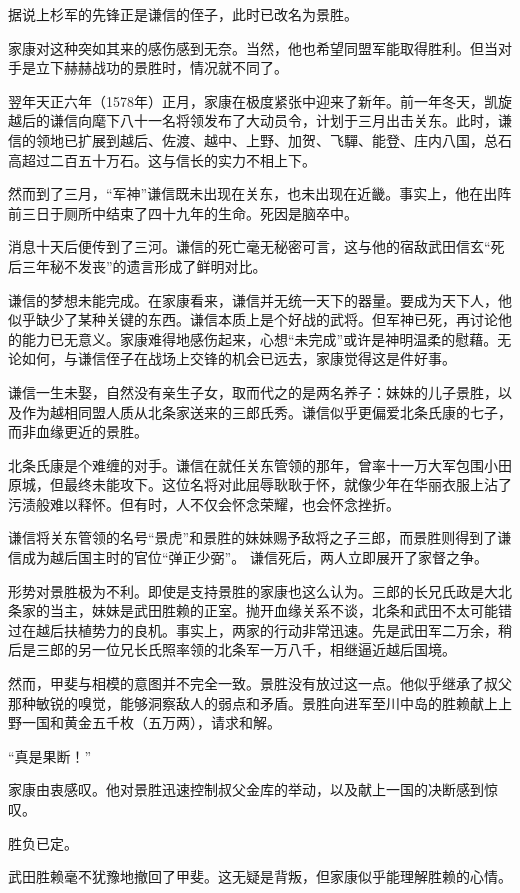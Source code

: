 \documentclass[
]{article}
\begin{document}
据说上杉军的先锋正是谦信的侄子，此时已改名为景胜。

家康对这种突如其来的感伤感到无奈。当然，他也希望同盟军能取得胜利。但当对手是立下赫赫战功的景胜时，情况就不同了。

翌年天正六年（1578年）正月，家康在极度紧张中迎来了新年。前一年冬天，凯旋越后的谦信向麾下八十一名将领发布了大动员令，计划于三月出击关东。此时，谦信的领地已扩展到越后、佐渡、越中、上野、加贺、飞驒、能登、庄内八国，总石高超过二百五十万石。这与信长的实力不相上下。

然而到了三月，``军神''谦信既未出现在关东，也未出现在近畿。事实上，他在出阵前三日于厕所中结束了四十九年的生命。死因是脑卒中。

消息十天后便传到了三河。谦信的死亡毫无秘密可言，这与他的宿敌武田信玄``死后三年秘不发丧''的遗言形成了鲜明对比。

谦信的梦想未能完成。在家康看来，谦信并无统一天下的器量。要成为天下人，他似乎缺少了某种关键的东西。谦信本质上是个好战的武将。但军神已死，再讨论他的能力已无意义。家康难得地感伤起来，心想``未完成''或许是神明温柔的慰藉。无论如何，与谦信侄子在战场上交锋的机会已远去，家康觉得这是件好事。

谦信一生未娶，自然没有亲生子女，取而代之的是两名养子：妹妹的儿子景胜，以及作为越相同盟人质从北条家送来的三郎氏秀。谦信似乎更偏爱北条氏康的七子，而非血缘更近的景胜。

北条氏康是个难缠的对手。谦信在就任关东管领的那年，曾率十一万大军包围小田原城，但最终未能攻下。这位名将对此屈辱耿耿于怀，就像少年在华丽衣服上沾了污渍般难以释怀。但有时，人不仅会怀念荣耀，也会怀念挫折。

谦信将关东管领的名号``景虎''和景胜的妹妹赐予敌将之子三郎，而景胜则得到了谦信成为越后国主时的官位``弹正少弼''。
谦信死后，两人立即展开了家督之争。

形势对景胜极为不利。即使是支持景胜的家康也这么认为。三郎的长兄氏政是大北条家的当主，妹妹是武田胜赖的正室。抛开血缘关系不谈，北条和武田不太可能错过在越后扶植势力的良机。事实上，两家的行动非常迅速。先是武田军二万余，稍后是三郎的另一位兄长氏照率领的北条军一万八千，相继逼近越后国境。

然而，甲斐与相模的意图并不完全一致。景胜没有放过这一点。他似乎继承了叔父那种敏锐的嗅觉，能够洞察敌人的弱点和矛盾。景胜向进军至川中岛的胜赖献上上野一国和黄金五千枚（五万两），请求和解。

``真是果断！''

家康由衷感叹。他对景胜迅速控制叔父金库的举动，以及献上一国的决断感到惊叹。

胜负已定。

武田胜赖毫不犹豫地撤回了甲斐。这无疑是背叛，但家康似乎能理解胜赖的心情。
\end{document}

